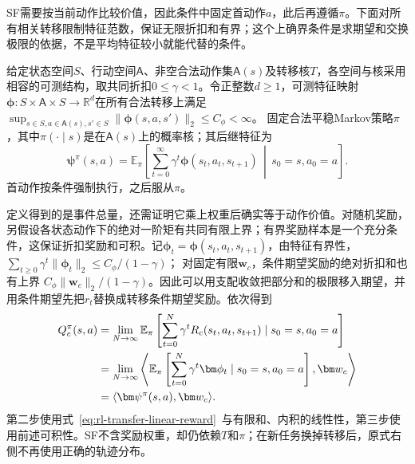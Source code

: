 SF需要按当前动作比较价值，因此条件中固定首动作$a$，此后再遵循$\pi$。下面对所有相关转移限制特征范数，保证无限折扣和有界；这个上确界条件是求期望和交换极限的依据，不是平均特征较小就能代替的条件。

\begin{definition}[固定策略的后继特征]
 \label{def:rl-transfer-sf}
 给定状态空间$S$、行动空间$\mathsf A$、非空合法动作集$\mathsf A(s)$及转移核$T$，各空间与核采用相容的可测结构，取共同折扣$0\leq\gamma<1$。令正整数$d\geq1$，可测特征映射$\bm\phi:S\times\mathsf A\times S\to\mathbb R^d$在所有合法转移上满足
 $\sup_{s\in S,a\in\mathsf A(s),s'\in S}\lVert\bm\phi(s,a,s')\rVert_2\leq C_\phi<\infty$。
 固定合法平稳Markov策略$\pi$，其中$\pi(\cdot\mid s)$是在$\mathsf A(s)$上的概率核；其后继特征为
 \begin{equation}
 \bm\psi^\pi(s,a)=
 \mathbb E_\pi\!\left[
 \sum_{t=0}^{\infty}\gamma^t\bm\phi(s_t,a_t,s_{t+1})
 \,\middle|\,s_0=s,a_0=a\right].
 \label{eq:rl-transfer-sf}
 \end{equation}
 首动作按条件强制执行，之后服从$\pi$。
\end{definition}

定义得到的是事件总量，还需证明它乘上权重后确实等于动作价值。对随机奖励，另假设各状态动作下的绝对一阶矩有共同有限上界；有界奖励样本是一个充分条件，这保证折扣奖励和可积。记$\bm\phi_t=\bm\phi(s_t,a_t,s_{t+1})$，由特征有界性，
$\sum_{t\geq0}\gamma^t\lVert\bm\phi_t\rVert_2\leq C_\phi/(1-\gamma)$；
对固定有限$\bm w_c$，条件期望奖励的绝对折扣和也有上界
$C_\phi\lVert\bm w_c\rVert_2/(1-\gamma)$。因此可以用支配收敛把部分和的极限移入期望，并用条件期望先把$r_t$替换成转移条件期望奖励。依次得到
\begin{align}
 Q_c^\pi(s,a)
 &=\lim_{N\to\infty}\mathbb E_\pi
       \left[\sum_{t=0}^{N}\gamma^t R_c(s_t,a_t,s_{t+1})
       \mid s_0=s,a_0=a\right]\notag\\
 &=\lim_{N\to\infty}\left\langle
       \mathbb E_\pi\left[\sum_{t=0}^{N}\gamma^t\bm\phi_t
       \mid s_0=s,a_0=a\right],\bm w_c\right\rangle\notag\\
 &=\langle\bm\psi^\pi(s,a),\bm w_c\rangle.
 \label{eq:rl-transfer-sf-value}
\end{align}
第二步使用式~\eqref{eq:rl-transfer-linear-reward}~与有限和、内积的线性性，第三步使用前述可积性。SF不含奖励权重，却仍依赖$T$和$\pi$；在新任务换掉转移后，原式右侧不再使用正确的轨迹分布。

